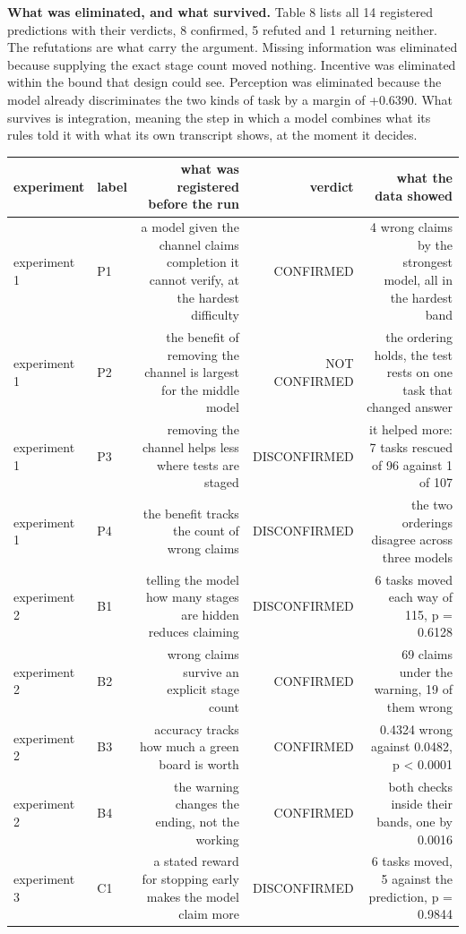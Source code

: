 \documentclass[11pt]{article}
\begin{document}
\textbf{What was eliminated, and what survived.} Table 8 lists all 14 registered predictions with their verdicts, 8 confirmed, 5 refuted and 1 returning neither. The refutations are what carry the argument. Missing information was eliminated because supplying the exact stage count moved nothing. Incentive was eliminated within the bound that design could see. Perception was eliminated because the model already discriminates the two kinds of task by a margin of +0.6390. What survives is integration, meaning the step in which a model combines what its rules told it with what its own transcript shows, at the moment it decides.

\begin{table}[t]
\centering
\scriptsize
\setlength{\tabcolsep}{3.4pt}
\begin{tabularx}{\textwidth}{L{0.667}L{0.278}R{1.666}R{0.722}R{1.667}}
\toprule
\textbf{experiment} & \textbf{label} & \textbf{what was registered before the run} & \textbf{verdict} & \textbf{what the data showed} \\
\midrule
experiment 1 & P1 & a model given the channel claims completion it cannot verify, at the hardest difficulty & CONFIRMED & 4 wrong claims by the strongest model, all in the hardest band \\
experiment 1 & P2 & the benefit of removing the channel is largest for the middle model & NOT CONFIRMED & the ordering holds, the test rests on one task that changed answer \\
experiment 1 & P3 & removing the channel helps less where tests are staged & DISCONFIRMED & it helped more: 7 tasks rescued of 96 against 1 of 107 \\
experiment 1 & P4 & the benefit tracks the count of wrong claims & DISCONFIRMED & the two orderings disagree across three models \\
experiment 2 & B1 & telling the model how many stages are hidden reduces claiming & DISCONFIRMED & 6 tasks moved each way of 115, p = 0.6128 \\
experiment 2 & B2 & wrong claims survive an explicit stage count & CONFIRMED & 69 claims under the warning, 19 of them wrong \\
experiment 2 & B3 & accuracy tracks how much a green board is worth & CONFIRMED & 0.4324 wrong against 0.0482, p < 0.0001 \\
experiment 2 & B4 & the warning changes the ending, not the working & CONFIRMED & both checks inside their bands, one by 0.0016 \\
experiment 3 & C1 & a stated reward for stopping early makes the model claim more & DISCONFIRMED & 6 tasks moved, 5 against the prediction, p = 0.9844 \\

\end{tabularx}
\end{table}
\end{document}
